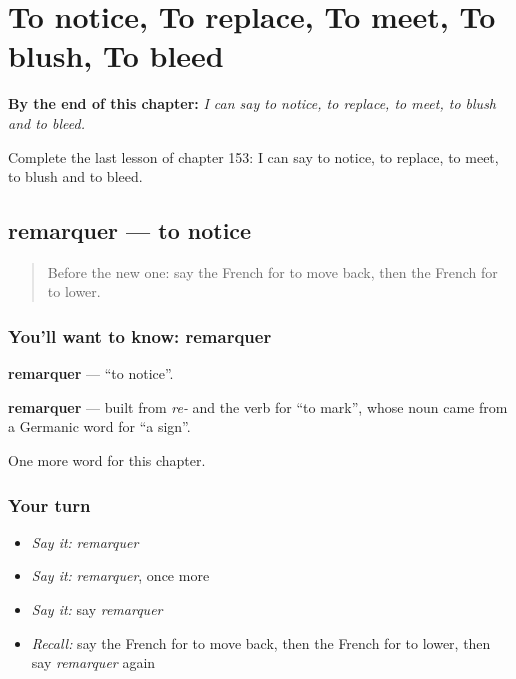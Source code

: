 
\chapter{To notice, To replace, To meet, To blush, To bleed}
\label{ch:fr-to-notice-to-replace-to-meet-to-blush-to-bleed}

\begin{chapteropening}
\textbf{By the end of this chapter:} \emph{I can say to notice, to replace, to meet, to blush and to bleed.}

Complete the last lesson of chapter 153: I can say to notice, to replace, to meet, to blush and to bleed.
\end{chapteropening}

\section[remarquer]{remarquer — to notice}

\label{lesson:FR-C153-remarquer}



\begin{quote}
Before the new one: say the French for to move back, then the French for to lower.
\end{quote}

\subsection*{You'll want to know: remarquer}
\textbf{remarquer} — \textquotedblleft{}to notice\textquotedblright{}.

\begin{cousinweb}
\textbf{remarquer} — built from \emph{re-} and the verb for \textquotedblleft{}to mark\textquotedblright{}, whose noun came from a Germanic word for \textquotedblleft{}a sign\textquotedblright{}.
\end{cousinweb}

\begin{grammarlens}[title={What you've built}]
One more word for this chapter.
\end{grammarlens}

\subsection*{Your turn}
\begin{itemize}
\raggedright
  \item \emph{Say it:} \emph{remarquer}
  \item \emph{Say it:} \emph{remarquer}, once more
  \item \emph{Say it:} say \emph{remarquer}
  \item \emph{Recall:} say the French for to move back, then the French for to lower, then say \emph{remarquer} again
\end{itemize}

